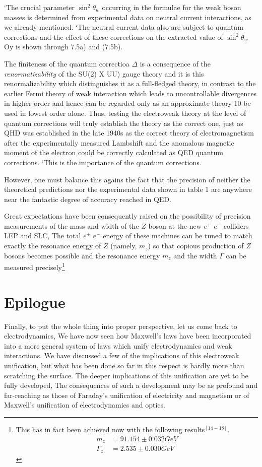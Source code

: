 {‘The crucial parameter $\sin^{2} \theta_{w}$ occurring in the formulae for the weak boson masses is determined
from experimental data on neutral current interactions, as we already mentioned. ‘The neutral current
data also are subject to quantum corrections and the effect of these corrections on the extracted
value of $\sin^{2} \theta_{w}$ Oy is shown through 7.5a) and (7.5b). 

The finiteness of the quantum correctioa $\Delta$ is a consequence of the {\it renormatizability} of the
SU(2) X UU) gauge theory and it is this renormalizability which distinguishes it as a full-fledged
theory, in contrast to the earlier Fermi theory of weak interaction which leads to uncontrollable
divergences in higher order and hence can be regarded only as an approximate theory 10 be used
in lowest order alone. Thus, testing the electroweak theory at the level of quantum corrections will
truly establish the theory as the correct one, just as QHD was established in the late 1940s as the
correct theory of electromagnetism after the experimentally measured Lambshift and the anomalous
magnetic moment of the electron could be correctly calculated as QED quantum corrections. ‘This
is the importance of the quantum corrections.

However, one must balance this agains the fact that the precision of neither the theoretical
predictions nor the experimental data shown in table 1 are anywhere near the fantastic degree of
accuracy reached in QED. 

Great expectations have been consequently raised on the possibility of precision measurements
of the mass and width of the $Z$ boson at the new $e^{+}$ $e^{-}$ colliders LEP and SLC, The total $e^{+}$ $e^{-}$
energy of these machines can be tuned to match exactly the resonance energy of $Z$ (namely, $m_{z}$)
so that copious production of $Z$ bosons becomes possible and the resonance energy $m_{z}$ and the
width $\Gamma$ can be measured precisely\footnote{This has in fact been achieved now with the following results$^{[14-18]}$.
\begin{align*}
m_{z} &= 91.154 \pm 0.032 GeV\\
\Gamma_{z}& = 2.535 \pm 0.030 GeV
\end{align*}
 }

\section{Epilogue}

Finally, to put the whole thing into proper perspective, let us come back to electrodynamics, We
have now seen how Maxwell's laws have been incorporated into a more general system of laws
which unify clectrodynamics and weak interactions. We have discussed a few of the implications of
this electroweak unification, but what has been done so far in this respect is hardly more than
scratching the surface. The deeper implications of this unification are yet to be fully developed,
The consequences of such a development may be as profound and far-reaching as those of Faraday’s
unification of electricity and magnetism or of Maxwell’s unification of electrodynamics and optics.   

}
